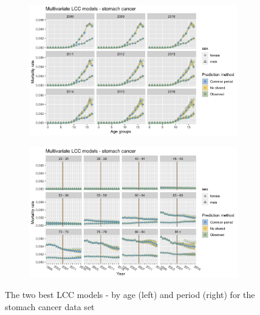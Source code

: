 \begin{figure}[h!]
    \centering
    \begin{subfigure}[b]{.45\linewidth}
        \includegraphics[width=\linewidth]{real-data/real-data-multivariate/Figures/multivariate-LCC-by-age-stomach.png}
    \end{subfigure}
    \begin{subfigure}[b]{.45\linewidth}
        \includegraphics[width=\linewidth]{real-data/real-data-multivariate/Figures/multivariate-LCC-by-period-stomach.png}
    \end{subfigure}
    \caption{The two best LCC models - by age (left) and period (right) for the stomach cancer data set}
    \label{fig:mv-LCC-stomach}
\end{figure}

